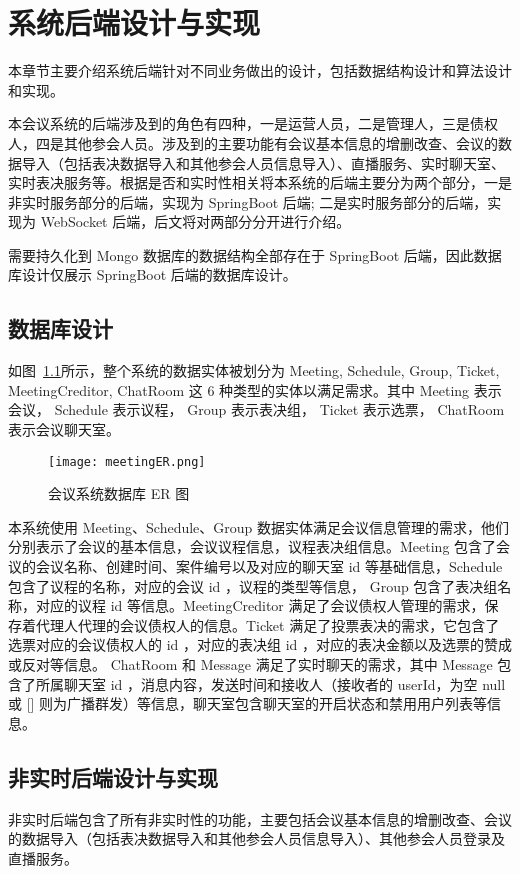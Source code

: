 
\chapter{系统后端设计与实现}
本章节主要介绍系统后端针对不同业务做出的设计，包括数据结构设计和算法设计和实现。

本会议系统的后端涉及到的角色有四种，一是运营人员，二是管理人，三是债权人，四是其他参会人员。涉及到的主要功能有会议基本信息的增删改查、会议的数据导入（包括表决数据导入和其他参会人员信息导入）、直播服务、实时聊天室、实时表决服务等。根据是否和实时性相关将本系统的后端主要分为两个部分，一是非实时服务部分的后端，实现为 SpringBoot 后端; 二是实时服务部分的后端，实现为 WebSocket 后端，后文将对两部分分开进行介绍。

需要持久化到 Mongo 数据库的数据结构全部存在于 SpringBoot 后端，因此数据库设计仅展示 SpringBoot 后端的数据库设计。

\section{数据库设计}
如图~\ref{fig:meetingER}所示，整个系统的数据实体被划分为 Meeting, Schedule,
Group, Ticket, MeetingCreditor, ChatRoom 这 6 种类型的实体以满足需求。其中 Meeting 表示会议， Schedule 表示议程， Group 表示表决组， Ticket 表示选票， ChatRoom 表示会议聊天室。

\begin{figure}[!htp]
    \centering
    \texttt{[image: meetingER.png]}
    \caption{会议系统数据库 ER 图}
    \label{fig:meetingER}
  \end{figure}

本系统使用 Meeting、Schedule、Group 数据实体满足会议信息管理的需求，他们分别表示了会议的基本信息，会议议程信息，议程表决组信息。Meeting 包含了会议的会议名称、创建时间、案件编号以及对应的聊天室 id 等基础信息，Schedule 包含了议程的名称，对应的会议 id ，议程的类型等信息， Group 包含了表决组名称，对应的议程 id 等信息。MeetingCreditor 满足了会议债权人管理的需求，保存着代理人代理的会议债权人的信息。Ticket 满足了投票表决的需求，它包含了选票对应的会议债权人的 id ，对应的表决组 id ，对应的表决金额以及选票的赞成或反对等信息。 ChatRoom 和 Message 满足了实时聊天的需求，其中 Message 包含了所属聊天室 id ，消息内容，发送时间和接收人（接收者的 userId，为空 null 或 [] 则为广播群发）等信息，聊天室包含聊天室的开启状态和禁用用户列表等信息。

\section{非实时后端设计与实现}
非实时后端包含了所有非实时性的功能，主要包括会议基本信息的增删改查、会议的数据导入（包括表决数据导入和其他参会人员信息导入）、其他参会人员登录及直播服务。


